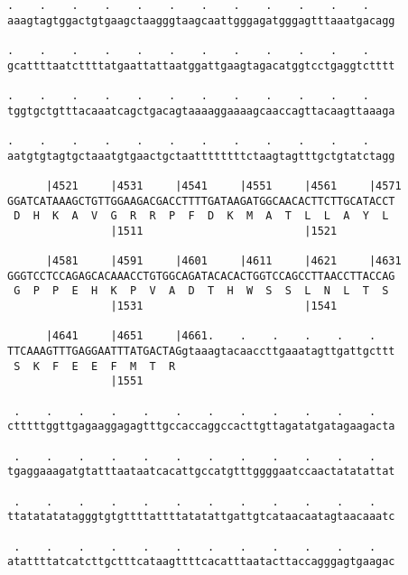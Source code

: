 \documentclass{article}
\begin{document}
\begin{Verbatim}
.    .    .    .    .    .    .    .    .    .    .    .    
aaagtagtggactgtgaagctaagggtaagcaattgggagatgggagtttaaatgacagg
                                                            
.    .    .    .    .    .    .    .    .    .    .    .    
gcattttaatcttttatgaattattaatggattgaagtagacatggtcctgaggtctttt
                                                            
.    .    .    .    .    .    .    .    .    .    .    .    
tggtgctgtttacaaatcagctgacagtaaaaggaaaagcaaccagttacaagttaaaga
                                                            
.    .    .    .    .    .    .    .    .    .    .    .    
aatgtgtagtgctaaatgtgaactgctaattttttttctaagtagtttgctgtatctagg
                                                            
      |4521     |4531     |4541     |4551     |4561     |4571
GGATCATAAAGCTGTTGGAAGACGACCTTTTGATAAGATGGCAACACTTCTTGCATACCT
 D  H  K  A  V  G  R  R  P  F  D  K  M  A  T  L  L  A  Y  L 
                |1511                         |1521         
  
      |4581     |4591     |4601     |4611     |4621     |4631
GGGTCCTCCAGAGCACAAACCTGTGGCAGATACACACTGGTCCAGCCTTAACCTTACCAG
 G  P  P  E  H  K  P  V  A  D  T  H  W  S  S  L  N  L  T  S 
                |1531                         |1541         
  
      |4641     |4651     |4661.    .    .    .    .    .   
TTCAAAGTTTGAGGAATTTATGACTAGgtaaagtacaaccttgaaatagttgattgcttt
 S  K  F  E  E  F  M  T  R                                  
                |1551                                       
  
 .    .    .    .    .    .    .    .    .    .    .    .   
ctttttggttgagaaggagagtttgccaccaggccacttgttagatatgatagaagacta
                                                            
 .    .    .    .    .    .    .    .    .    .    .    .   
tgaggaaagatgtatttaataatcacattgccatgtttggggaatccaactatatattat
                                                            
 .    .    .    .    .    .    .    .    .    .    .    .   
ttatatatatagggtgtgttttattttatatattgattgtcataacaatagtaacaaatc
                                                            
 .    .    .    .    .    .    .    .    .    .    .    .   
atattttatcatcttgctttcataagttttcacatttaatacttaccagggagtgaagac
                                                            

\end{Verbatim}
\end{document}
